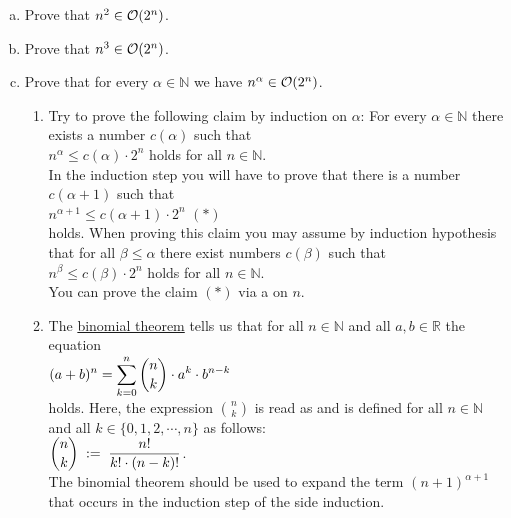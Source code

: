 \exercise
\begin{enumerate}[(a)]
\item Prove that $n^2 \in \mathcal{O}(2^n)$. 
\item Prove that $n^3 \in \mathcal{O}(2^n)$. 
\item Prove that for every $\alpha \in \mathbb{N}$ we have  $n^\alpha \in \mathcal{O}(2^n)$. 
      
      \hint
      \begin{enumerate}[1.]
      \item Try to prove the following claim by induction on $\alpha$:  For every $\alpha \in \mathbb{N}$
            there exists a number $c(\alpha)$ such that
            \\[0.2cm]
            \hspace*{1.3cm}
            $n^\alpha \leq c(\alpha) \cdot 2^n$ \quad holds for all $n \in \mathbb{N}$.
            \\[0.2cm]
            In the induction step you will have to prove that there is a number $c(\alpha+1)$ such that
            \\[0.2cm]
            \hspace*{1.3cm}
            $n^{\alpha+1} \leq c(\alpha+1) \cdot 2^n$ \hspace*{\fill} $(*)$
            \\[0.2cm]
            holds.  When proving this claim you may assume by induction hypothesis that for all 
            $\beta \leq \alpha$ there exist numbers $c(\beta)$ such that
            \\[0.2cm]
            \hspace*{1.3cm}
            $n^{\beta} \leq c(\beta) \cdot 2^n$ \quad holds for all $n \in \mathbb{N}$.
            \\[0.2cm]
            You can prove the claim $(*)$ via a  on $n$.
      \item The \href{https://en.wikipedia.org/wiki/Binomial_theorem}{binomial theorem} tells
            us that for all $n \in \mathbb{N}$ and all $a,b \in \mathbb{R}$ the equation
            \\[0.2cm]
            \hspace*{1.3cm}
            $\displaystyle (a+b)^n = \sum\limits_{k=0}^n {n \choose k} \cdot a^k \cdot b^{n-k}$
            \\[0.2cm]
            holds.  Here, the expression ${n \choose k}$ is read as  and is
            defined for all $n \in \mathbb{N}$ and all $k \in \{0, 1, 2, \cdots, n\}$ as follows:
            \\[0.2cm]
            \hspace*{1.3cm}
            $\displaystyle {n \choose k} \;:=\; \frac{n!}{k! \cdot (n-k)!}$.
            \\[0.2cm]
            The binomial theorem should be used to expand the term $(n+1)^{\alpha + 1}$ that occurs
            in the induction step of the side induction.  \eox
      \end{enumerate}
\end{enumerate}
